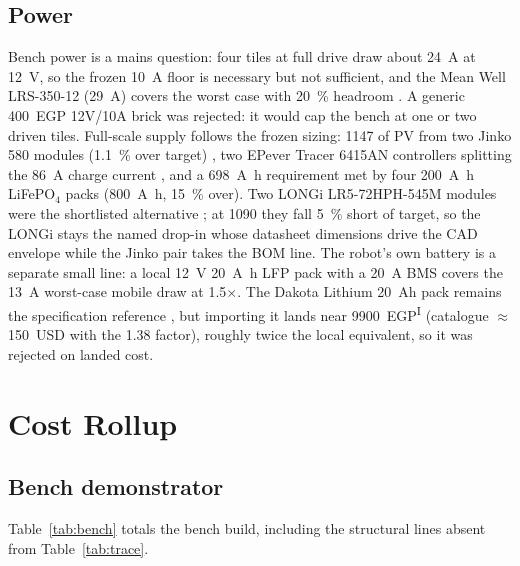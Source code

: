 \documentclass[11pt,a4paper]{article}
\newcommand{\indflag}{\textsuperscript{I}}
\begin{document}
\subsection{Power}
Bench power is a mains question: four tiles at full drive draw about
\SI{24}{\ampere} at \SI{12}{\volt}, so the frozen \SI{10}{\ampere} floor is
necessary but not sufficient, and the Mean Well LRS-350-12
(\SI{29}{\ampere}) covers the worst case with \SI{20}{\percent} headroom
\cite{meanwell2023lrs}. A generic \num{400}~EGP 12V/10A brick was rejected:
it would cap the bench at one or two driven tiles. Full-scale supply follows
the frozen sizing: \SI{1147}{\Wp} of PV from two Jinko \SI{580}{\Wp} modules
(\SI{1.1}{\percent} over target) \cite{jinko2024tigerneo}, two EPever Tracer
6415AN controllers splitting the \SI{86}{\ampere} charge current
\cite{epever2023tracer}, and a \SI{698}{\ampere\hour} requirement met by four
\SI{200}{\ampere\hour} LiFePO$_4$ packs (\SI{800}{\ampere\hour},
\SI{15}{\percent} over). Two LONGi LR5-72HPH-545M modules were the
shortlisted alternative \cite{longi2022himo5}; at \SI{1090}{\Wp} they fall
\SI{5}{\percent} short of target, so the LONGi stays the named drop-in whose
datasheet dimensions drive the CAD envelope while the Jinko pair takes the
BOM line. The robot's own battery is a separate small line: a local
\SI{12}{\volt} \SI{20}{\ampere\hour} LFP pack with a \SI{20}{\ampere} BMS
covers the \SI{13}{\ampere} worst-case mobile draw at 1.5$\times$. The Dakota
Lithium 20~Ah pack remains the specification reference
\cite{dakota2023battery}, but importing it lands near \num{9900}~EGP\indflag{}
(catalogue $\approx$150~USD with the \num{1.38} factor), roughly twice the
local equivalent, so it was rejected on landed cost.

\section{Cost Rollup}
\label{sec:rollup}

\subsection{Bench demonstrator}
Table~\ref{tab:bench} totals the bench build, including the structural lines
absent from Table~\ref{tab:trace}.
\end{document}
